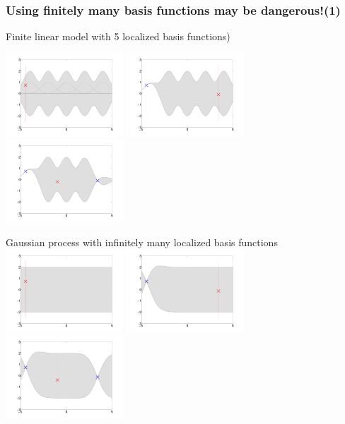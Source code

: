 \begin{frame}
\frametitle{\!\!\!Using finitely many basis functions may be dangerous!(1)}

Finite linear model with 5 localized basis functions)

\includegraphics[width=0.33\textwidth]{seq_linear_M1.pdf}
\includegraphics[width=0.33\textwidth]{seq_linear_M2.pdf}
\includegraphics[width=0.33\textwidth]{seq_linear_M3.pdf}

Gaussian process with infinitely many localized basis functions
\includegraphics[width=0.33\textwidth]{seq_fullGP_M1.pdf}
\includegraphics[width=0.33\textwidth]{seq_fullGP_M2.pdf}
\includegraphics[width=0.33\textwidth]{seq_fullGP_M3.pdf}


\end{frame}

